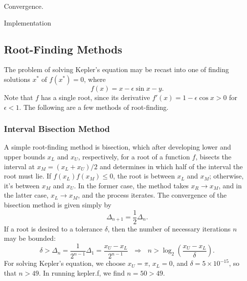 \documentclass[10pt]{article}
\begin{document}
\noindent Convergence.

\noindent Implementation


\subsection{Root-Finding Methods}
\noindent The problem of solving Kepler's equation may be recast into one of finding solutions $x^*$ of $f\left(x^*\right) = 0$, where
\begin{equation*}
f\left(x\right) = x - \epsilon \sin x - y.
\end{equation*}
\noindent Note that $f$ has a single root, since its derivative $f'\left(x\right) = 1 - \epsilon \cos x > 0$ for $\epsilon < 1$. The following are a few  methods of root-finding.


\subsubsection{Interval Bisection Method}
\noindent A simple root-finding method is bisection, which after developing lower and upper bounds $x_L$ and $x_U$, respectively, for a root of a function $f$, bisects the interval at $x_M = \left(x_L+x_U\right)/2$ and determines in which half of the interval the root must lie. If $f\left(x_L\right) f\left(x_M\right) \le 0$, the root is between $x_L$ and $x_M$; otherwise, it's between $x_M$ and $x_U$. In the former case, the method takes $x_R \rightarrow x_M$, and in the latter case, $x_L \rightarrow x_M$, and the process iterates. The convergence of the bisection method is given simply by
\begin{equation*}
\Delta_{n+1} = \frac{1}{2} \Delta_n.
\end{equation*}
\noindent If a root is desired to a tolerance $\delta$, then the number of necessary iterations $n$ may be bounded:
\begin{equation*}
\delta > \Delta_{n} = \frac{1}{2^{n-1}} \Delta_1 = \frac{x_U-x_L}{2^{n-1}} \ \ \ \Rightarrow \ \ \ n > \log_2 \left(\frac{x_U-x_L}{\delta}\right).
\end{equation*}
\noindent For solving Kepler's equation, we choose $x_U = \pi$, $x_L = 0$, and $\delta = 5 \times 10^{-15}$, so that $n > 49$. In running kepler.f, we find $n=50>49$.

\end{document}
